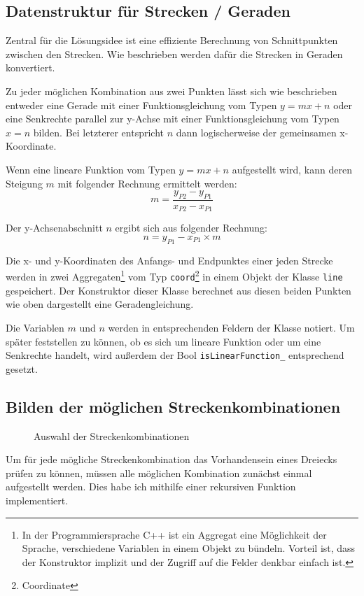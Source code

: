 \subsection {Datenstruktur für Strecken / Geraden}
Zentral für die Lösungsidee ist eine effiziente Berechnung von Schnittpunkten
zwischen den Strecken.
Wie beschrieben werden dafür die Strecken in Geraden konvertiert.

Zu jeder möglichen Kombination aus zwei Punkten lässt sich wie beschrieben
entweder eine Gerade mit einer Funktionsgleichung vom Typen \(y=mx+n\) oder
eine Senkrechte parallel zur y-Achse mit einer Funktionsgleichung vom Typen \(x=n\)
bilden.
Bei letzterer entspricht  \(n\) dann logischerweise der gemeinsamen x-Koordinate.

Wenn eine lineare Funktion vom Typen \(y=mx+n\) aufgestellt wird,
kann deren Steigung \(m\) mit folgender Rechnung ermittelt werden:
\begin{equation}
    m=\frac{y_{P2} - y_{P1}}{x_{P2} - x_{P1}}
\end{equation}

Der y-Achsenabschnitt \(n\) ergibt sich aus folgender Rechnung:
\begin{equation}
    n=y_{P1} - x_{P1} \times m
\end{equation}

Die x- und y-Koordinaten des Anfangs- und Endpunktes einer jeden Strecke werden
in zwei Aggregaten\footnote{In der Programmiersprache C++ ist ein Aggregat eine
Möglichkeit der Sprache, verschiedene Variablen in einem Objekt zu bündeln.
Vorteil ist, dass der Konstruktor implizit und der Zugriff auf die Felder denkbar
einfach ist.} 
vom Typ \texttt{coord}\footnote{Coordinate} in einem Objekt der Klasse \texttt{line}
gespeichert.
Der Konstruktor dieser Klasse berechnet aus diesen beiden Punkten
wie oben dargestellt eine Geradengleichung.

Die Variablen \(m\) und \(n\) werden in entsprechenden Feldern der Klasse notiert.
Um später feststellen zu können, ob es sich um lineare Funktion oder um eine Senkrechte 
handelt, wird außerdem der Bool \texttt{isLinearFunction\_} entsprechend gesetzt.

\subsection {Bilden der möglichen Streckenkombinationen}
\begin{wrapfigure}{r}{0.5\textwidth}
    
    \caption{Auswahl der Streckenkombinationen}
    \label{abb:streckrek}
\end{wrapfigure}
Um für jede mögliche Streckenkombination das Vorhandensein eines Dreiecks prüfen zu können, müssen alle möglichen Kombination zunächst einmal aufgestellt werden. Dies habe ich mithilfe einer rekursiven Funktion implementiert.


